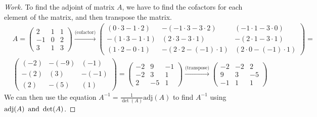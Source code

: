 \documentclass{article}
\begin{document}
\begin{proof}[Work]
    To find the adjoint of matrix $A$, we have to find the cofactors for each element of the matrix, and then transpose the matrix.
    \begin{align*}
         & A = \begin{pmatrix}
                   2  & 1 & 1 \\
                   -1 & 0 & 2 \\
                   3  & 1 & 3
               \end{pmatrix} \xrightarrow{\text{(cofactor)}}
        \begin{pmatrix}
            (0 \cdot 3 - 1 \cdot 2)  & -(-1 \cdot 3 - 3 \cdot 2)   & (-1 \cdot 1 - 3 \cdot 0)   \\
            -(1 \cdot 3 - 1 \cdot 1) & (2 \cdot 3 - 3 \cdot 1)     & -(2 \cdot 1 - 3 \cdot 1)   \\
            (1 \cdot 2 - 0 \cdot 1)  & -(2 \cdot 2 - (-1) \cdot 1) & (2 \cdot 0 - (-1) \cdot 1)
        \end{pmatrix} = \\
         & \begin{pmatrix}
               (-2) & -(-9) & (-1)  \\
               -(2) & (3)   & -(-1) \\
               (2)  & -(5)  & (1)
           \end{pmatrix} =
        \begin{pmatrix}
            -2 & 9  & -1 \\
            -2 & 3  & 1  \\
            2  & -5 & 1
        \end{pmatrix} \xrightarrow{\text{(transpose)}}
        \begin{pmatrix}
            -2 & -2 & 2  \\
            9  & 3  & -5 \\
            -1 & 1  & 1
        \end{pmatrix}
    \end{align*}
    We can then use the equation $A^{-1} = \frac{1}{\det(A)}\text{adj}(A)$ to find $A^{-1}$ using $\operatorname{\text{adj}}(A) \operatorname{~\text{and}~} \det(A)$.

\end{proof}
\end{document}
